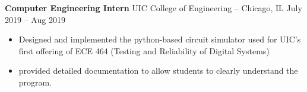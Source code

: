 \documentclass[11pt,letterpaper]{article}
\newcommand{\subheading}[3]{
    \textbf{#1}{ #2 }{\hfill #3 \vspace{-2pt}}
}
\begin{document}
\vspace{-10pt}
\subheading{Computer Engineering Intern}{UIC College of Engineering -- Chicago, IL}{ July 2019 -- Aug 2019 \\}
\vspace{-10pt}
\begin{itemize}
  \item Designed and implemented the python-based circuit simulator used for UIC's first offering of ECE 464 (Testing and Reliability of Digital Systems)
  \item provided detailed documentation to allow students to clearly understand the program.
\end{itemize}
\vspace{-10pt}
\begin{comment}
\subheading{Engineering Student Ambassador/Mentor}{UIC College of Engineering}{July 2019 -- Aug 2019 \\}
\vspace{-10pt}
\begin{itemize}
  \item Taught review classes and workshops on Math, Physics, Chemistry, Robotics, Circuits,among others, for 18 incoming freshmen.
  \item Guided my personal mentee’s success and first year experience at the University
\end{itemize}
\vspace{-10pt}
\end{comment}
\end{document}
